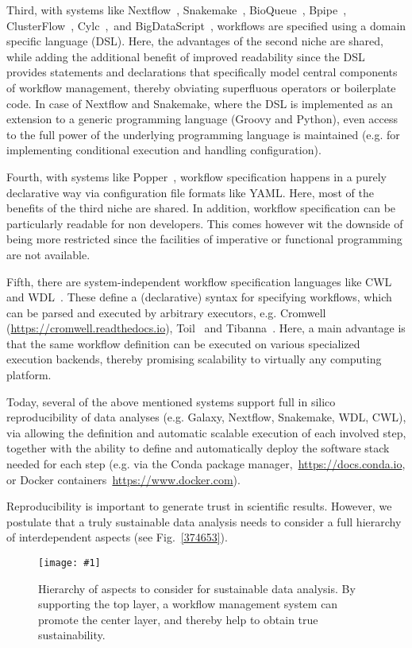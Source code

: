 \documentclass{scrartcl}
\newcommand{\image}[1]{\centering\texttt{[image: \#1]}}
\begin{document}
Third, with systems like Nextflow~\parencite{Di_Tommaso_2017}, Snakemake~\parencite{Köster2012}, BioQueue~\parencite{Yao2017}, Bpipe~\parencite{Sadedin2012}, ClusterFlow~\parencite{Ewels2016}, Cylc~\parencite{J_Oliver_2018},~and BigDataScript~\parencite{Cingolani_2014}, workflows are specified using a domain specific language (DSL).
Here, the advantages of the second niche are shared, while adding the additional benefit of improved readability since the DSL provides statements and declarations that specifically model central components of workflow management, thereby obviating superfluous operators or boilerplate code.
In case of Nextflow and Snakemake, where the DSL is implemented as an extension to a generic programming language (Groovy and Python), even access to the full power of the underlying programming language is maintained (e.g. for implementing conditional execution and handling configuration).

Fourth, with systems like Popper~\parencite{Jimenez_2017}, workflow specification happens in a purely declarative way via configuration file formats like YAML.
Here, most of the benefits of the third niche are shared.
In addition, workflow specification can be particularly readable for non developers.
This comes however wit the downside of being more restricted since the facilities of imperative or functional programming are not available.

Fifth, there are system-independent workflow specification languages like CWL~\parencite{cwl} and WDL~\parencite{voss_full-stack_2017}.
These define a (declarative) syntax for specifying workflows, which can be parsed and executed by arbitrary executors, e.g. Cromwell (\url{https://cromwell.readthedocs.io}), Toil~\parencite{Vivian_2017} and Tibanna~\parencite{Lee_2019}.
Here, a main advantage is that the same workflow definition can be executed on various specialized execution backends, thereby promising scalability to virtually any computing platform.

Today, several of the above mentioned systems support full in silico reproducibility of data analyses (e.g. Galaxy, Nextflow, Snakemake, WDL, CWL), via allowing the definition and automatic scalable execution of each involved step, together with the ability to define and automatically deploy the software stack needed for each step (e.g. via the Conda package manager,~\url{https://docs.conda.io}, or Docker containers~\url{https://www.docker.com}).

Reproducibility is important to generate trust in scientific results.
However, we postulate that a truly sustainable data analysis needs to consider a full hierarchy of interdependent aspects (see Fig.~{\ref{374653}}).

\begin{figure}
	\image{sustainability-in-wms.pdf}
	\caption{
		Hierarchy of aspects to consider for sustainable data analysis.
		By supporting the top layer, a workflow management system can promote the center layer, and thereby help to obtain true sustainability.
	}
\end{figure}

\printbibliography
\end{document}
